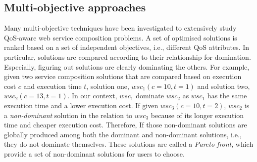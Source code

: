\subsection{Multi-objective approaches}\label{MultiObjective}

Many multi-objective techniques \cite{liu2005dynamic,zhang2010qos,yu2013efficient,yin2014hybrid,xiang2014qos,chen2014partial} have been investigated to extensively study QoS-aware web service composition problems.  A set of optimised solutions is ranked based on a set of independent objectives, i.e., different QoS attributes. In particular, solutions are compared according to their relationship for domination. Especially, figuring out solutions are clearly dominating the others. For example, given two service composition solutions that are compared based on execution cost $c$ and execution time $t$, solution one, $wsc_1(c=10,t=1)$ and solution two,  $wsc_2(c=13,t=1)$. In our context, $wsc_1$ dominate $wsc_2$ as $wsc_1$ has the same execution time and a lower execution cost. If given $wsc_3(c=10,t=2)$, $wsc_2$ is a \textit{non-dominant} solution in the relation to $wsc_3$ because of its longer execution time and cheaper execution cost. Therefore,  If those non-dominant solutions are globally produced among both the dominant and non-dominant solutions, i.e., they do not dominate themselves. These solutions are called a \textit{Pareto front}, which provide a set of non-dominant solutions for users to choose.


